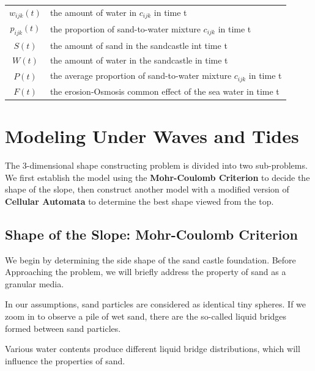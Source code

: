 \documentclass[12pt]{article}
\begin{document}
\begin{table}[H]
\begin{tabular}{cl}
        $w_{ijk}(t)$ & the amount of water in  $c_{ijk}$ in time t                         \\
        $p_{ijk}(t)$ & the proportion of sand-to-water mixture $c_{ijk}$ in time t         \\
        $S(t)$       & the amount of sand in the sandcastle	int time t                      \\
        $W(t)$       & the amount of water in the sandcastle in time t                     \\
        $P(t)$       & the average proportion of sand-to-water mixture $c_{ijk}$ in time t \\
        $F(t)$       & the erosion-Osmosis common effect of the sea water in time t        \\
        \hline
    \end{tabular}
    \label{bs2}
\end{table}

\section{Modeling Under Waves and Tides}
\par
The 3-dimensional shape constructing problem is divided into two sub-problems. We first establish the model using the \textbf{Mohr-Coulomb Criterion} to decide the shape of the slope, then construct another model with a modified version of \textbf{Cellular Automata} to determine the best shape viewed from the top.

\subsection{Shape of the Slope: Mohr-Coulomb Criterion}
We begin by determining the side shape of the sand castle foundation. Before Approaching the problem, we will briefly address the property of sand as a granular media.
\par
In our assumptions, sand particles are considered as identical tiny spheres. If we zoom in to observe a pile of wet sand, there are the so-called liquid bridges formed between sand particles.
\par
Various water contents produce different liquid bridge distributions, which will influence the properties of sand.
\end{document}
